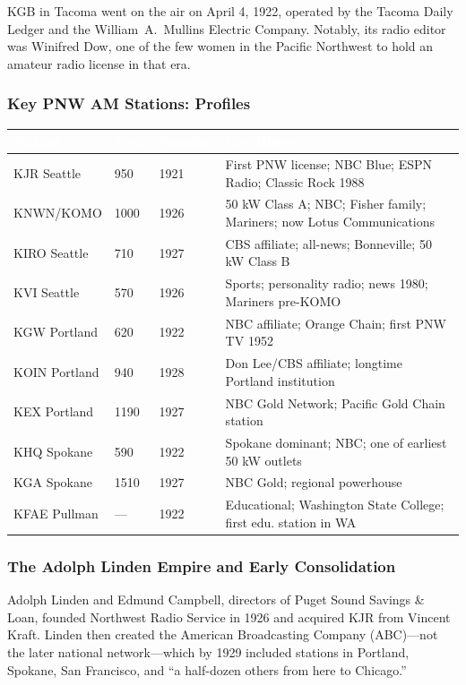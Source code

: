 \documentclass[11pt,letterpaper]{article}
\newcommand{\tableheader}[1]{\textbf{\sffamily\textcolor{white}{#1}}}
\begin{document}
\begin{asciibox}
KGB in Tacoma went on the air on April 4, 1922, operated by the Tacoma Daily Ledger and the
William~A.~Mullins Electric Company. Notably, its radio editor was Winifred Dow, one of the few
women in the Pacific Northwest to hold an amateur radio license in that era.

\subsubsection{Key PNW AM Stations: Profiles}

\begin{center}
\begin{tabularx}{\textwidth}{L{2.2cm}C{1.5cm}L{2.5cm}X}
\toprule
{}
\tableheader{Station} & \tableheader{Freq.} & \tableheader{Founded} & \tableheader{Key History} \\
\midrule
KJR Seattle & 950 & 1921 & First PNW license; NBC Blue; ESPN Radio; Classic Rock 1988 \\
KNWN/KOMO & 1000 & 1926 & 50 kW Class A; NBC; Fisher family; Mariners; now Lotus Communications \\
KIRO Seattle & 710 & 1927 & CBS affiliate; all-news; Bonneville; 50 kW Class B \\
KVI Seattle & 570 & 1926 & Sports; personality radio; news 1980; Mariners pre-KOMO \\
KGW Portland & 620 & 1922 & NBC affiliate; Orange Chain; first PNW TV 1952 \\
KOIN Portland & 940 & 1928 & Don Lee/CBS affiliate; longtime Portland institution \\
KEX Portland & 1190 & 1927 & NBC Gold Network; Pacific Gold Chain station \\
KHQ Spokane & 590 & 1922 & Spokane dominant; NBC; one of earliest 50 kW outlets \\
KGA Spokane & 1510 & 1927 & NBC Gold; regional powerhouse \\
KFAE Pullman & --- & 1922 & Educational; Washington State College; first edu. station in WA \\
\bottomrule
\end{tabularx}
\end{center}

\subsubsection{The Adolph Linden Empire and Early Consolidation}

Adolph Linden and Edmund Campbell, directors of Puget Sound Savings \& Loan, founded Northwest
Radio Service in 1926 and acquired KJR from Vincent Kraft. Linden then created the American
Broadcasting Company (ABC)---not the later national network---which by 1929 included stations
in Portland, Spokane, San Francisco, and ``a half-dozen others from here to Chicago.''


\end{asciibox}
\end{document}
